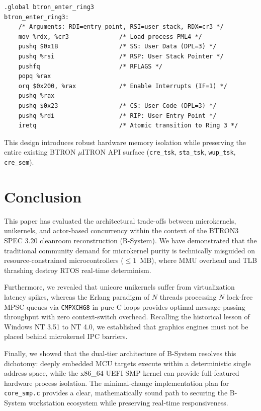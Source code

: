 \documentclass[10pt,journal,compsoc,twocolumn]{article}
\begin{document}
\begin{lstlisting}[language={[x86masm]Assembler}, caption={x86\_64 assembly stub for Ring 3 task entry.}]
.global btron_enter_ring3
btron_enter_ring3:
    /* Arguments: RDI=entry_point, RSI=user_stack, RDX=cr3 */
    mov %rdx, %cr3              /* Load process PML4 */
    pushq $0x1B                 /* SS: User Data (DPL=3) */
    pushq %rsi                  /* RSP: User Stack Pointer */
    pushfq                      /* RFLAGS */
    popq %rax
    orq $0x200, %rax            /* Enable Interrupts (IF=1) */
    pushq %rax
    pushq $0x23                 /* CS: User Code (DPL=3) */
    pushq %rdi                  /* RIP: User Entry Point */
    iretq                       /* Atomic transition to Ring 3 */
\end{lstlisting}

This design introduces robust hardware memory isolation while preserving the entire existing BTRON $\mu$ITRON API surface (\texttt{cre\_tsk}, \texttt{sta\_tsk}, \texttt{wup\_tsk}, \texttt{cre\_sem}).

\section{Conclusion}
\label{sec:conclusion}

This paper has evaluated the architectural trade-offs between microkernels, unikernels, and actor-based concurrency within the context of the BTRON3 SPEC 3.20 cleanroom reconstruction (B-System). We have demonstrated that the traditional community demand for microkernel purity is technically misguided on resource-constrained microcontrollers ($\le 1$~MB), where MMU overhead and TLB thrashing destroy RTOS real-time determinism. 

Furthermore, we revealed that unicore unikernels suffer from virtualization latency spikes, whereas the Erlang paradigm of $N$ threads processing $N$ lock-free MPSC queues via \texttt{CMPXCHG8} in pure C loops provides optimal message-passing throughput with zero context-switch overhead. Recalling the historical lesson of Windows NT 3.51 to NT 4.0, we established that graphics engines must not be placed behind microkernel IPC barriers.

Finally, we showed that the dual-tier architecture of B-System resolves this dichotomy: deeply embedded MCU targets execute within a deterministic single address space, while the x86\_64 UEFI SMP kernel can provide full-featured hardware process isolation. The minimal-change implementation plan for \texttt{core\_smp.c} provides a clear, mathematically sound path to securing the B-System workstation ecosystem while preserving real-time responsiveness.
\end{document}
